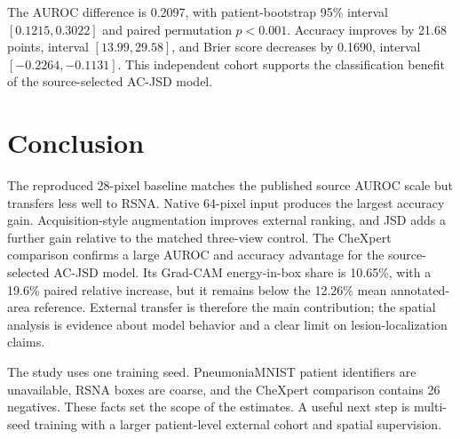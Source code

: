 \documentclass{article}
\begin{document}
\begin{table}[htbp]\centering\small
\caption{CheXpert evaluation on 143 images from 142 patients. AC-JSD uses $\lambda=36$; threshold is 0.5.}
\label{tab:chexpert}
\end{table}

The AUROC difference is 0.2097, with patient-bootstrap 95\% interval $[0.1215,0.3022]$ and paired permutation $p<0.001$. Accuracy improves by 21.68 points, interval $[13.99,29.58]$, and Brier score decreases by 0.1690, interval $[-0.2264,-0.1131]$. This independent cohort supports the classification benefit of the source-selected AC-JSD model.

\clearpage
\section{Conclusion}
The reproduced 28-pixel baseline matches the published source AUROC scale but transfers less well to RSNA. Native 64-pixel input produces the largest accuracy gain. Acquisition-style augmentation improves external ranking, and JSD adds a further gain relative to the matched three-view control. The CheXpert comparison confirms a large AUROC and accuracy advantage for the source-selected AC-JSD model. Its Grad-CAM energy-in-box share is 10.65\%, with a 19.6\% paired relative increase, but it remains below the 12.26\% mean annotated-area reference. External transfer is therefore the main contribution; the spatial analysis is evidence about model behavior and a clear limit on lesion-localization claims.

The study uses one training seed. PneumoniaMNIST patient identifiers are unavailable, RSNA boxes are coarse, and the CheXpert comparison contains 26 negatives. These facts set the scope of the estimates. A useful next step is multi-seed training with a larger patient-level external cohort and spatial supervision.


\end{document}
